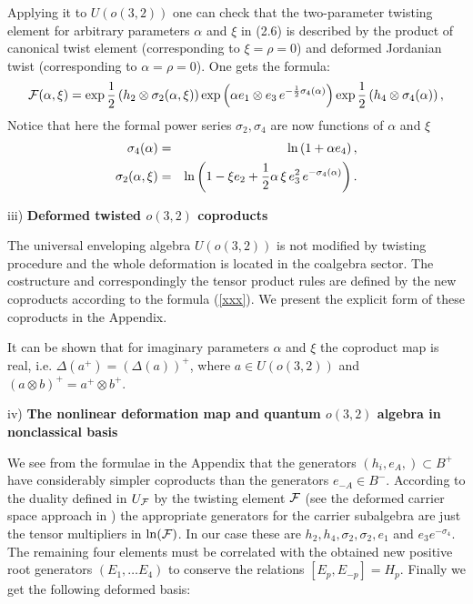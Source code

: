 \documentclass[a4paper,12pt,showkeys]{article}
\begin{document}
Applying it to $U(o(3,2))$ one can check that the two-parameter
twisting element for arbitrary parameters $\alpha$ and $\xi$ in
(2.6) is described by the product of canonical twist element
(corresponding to $\xi = \rho = 0$) and deformed Jordanian twist
(corresponding to $\alpha = \rho = 0$). One gets the formula:
\begin{equation}\label{llm2.15}
{\cal F}(\alpha, \xi)=\exp \frac{1}{2} \left( h_{2}
\otimes {\bf \sigma
}_{2}{(\alpha, \xi)}\right) \exp \left( \alpha e_{1}
\otimes
e_{3}\,
e^{-\frac{1}{2}{ \sigma }_{4}(\alpha)}\right) \exp
\frac{1}{2}\left( h_{4}\otimes {\bf \sigma }_{4}{(\alpha)}\right)
, \label{param-tw}
\end{equation}%
Notice that here the formal power series
 ${ \sigma_2, \sigma_4 }$ are now
functions
of $\alpha $ and $\xi $%
\begin{eqnarray}\label{llm2.16}
{\bf \sigma }_{4}{(\alpha)}
&=&
 \ln \left( 1 + \alpha e_{4}\right) ,
\label{sigmas}
\\
{\bf  \sigma }_{2} (\alpha, \xi )  &=&\ln \left( 1- \xi
e_{2}+\frac{1}{2}
\alpha \, \xi \, e_{3}^{2}\, e^{-{\bf \sigma }_{4}
(\alpha)}\right) .  \nonumber
\end{eqnarray}%


iii) {\bf Deformed twisted $o(3,2)$ coproducts}

 The universal enveloping algebra $U(o(3,2))$ is not modified
by twisting procedure and   the whole deformation
is located in the coalgebra sector. The costructure and
correspondingly the
tensor product rules are defined by the new coproducts according
to the formula (\ref{xxx}). We present the explicit form of these
coproducts in the Appendix.

It can be shown that for imaginary parameters $\alpha$ and $\xi$
the coproduct map is real, i.e. $\Delta(a^+)=(\Delta(a))^+$, where
$a\in U(o(3,2))$ and $(a \otimes b)^+= a^+ \otimes b^+$.

iv) {\bf The nonlinear deformation map and quantum $o(3,2)$ algebra in
nonclassical basis}

We see from the formulae in the Appendix that the generators
$(h_i , e_A, ) \subset B^+$ have considerably simpler coproducts
than the generators $e_{-A} \in B^-$.
 According to the duality defined in
 $U_{\cal F}$ by the twisting element ${\cal F}$ (see the deformed
 carrier space approach in
  \cite{ll16}) the appropriate generators for the
 carrier subalgebra are just the tensor multipliers in
 $\ln ({\cal F})$. In our case these are $h_2,h_4, \sigma_2, \sigma_2,
 e_1$ and $e_3 e^{-\sigma_4}$. The remaining four elements must be
 correlated with the obtained new positive root generators $(E_1,
 \dots E_4 )$ to conserve the relations $ [E_{p}, E_{-p} ]=H_p $.
 Finally we get the following deformed basis:
\end{document}
